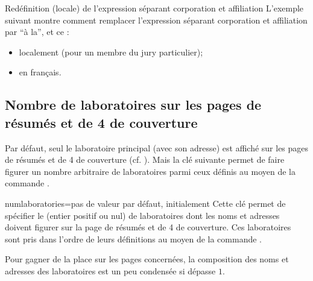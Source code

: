 \begin{dbexample}{Redéfinition (locale) de l'expression séparant corporation et
    affiliation}{}
  L'exemple suivant montre comment remplacer l'expression séparant corporation et
  affiliation par \enquote{\textvisiblespace{}à la\textvisiblespace{}}, et ce :
  \begin{itemize}
  \item localement (pour un membre du jury particulier);
  \item en français.
  \end{itemize}
\begin{bodycode}[listing options={showspaces}]
\end{bodycode}
\end{dbexample}

\subsection{Nombre de laboratoires sur les pages de résumés et de 4\ieme{} de couverture}
\label{sec-nombre-de-labor}
%
%

Par défaut, seul le laboratoire principal (avec son adresse) est affiché sur les
pages de résumés et de 4\ieme{} de couverture (cf. ). Mais la clé
 suivante permet de faire figurer un nombre arbitraire
de laboratoires parmi ceux définis au moyen de la commande .%
%
%

\begin{docKey}{numlaboratories}{=}{pas de valeur par
    défaut, initialement }
  Cette clé permet de spécifier le  (entier positif ou nul) de
  laboratoires dont les noms et adresses doivent figurer sur la page de résumés
  et de 4\ieme{} de couverture. Ces laboratoires sont pris dans l'ordre de
  leurs définitions au moyen de la commande .
\end{docKey}

Pour gagner de la place sur les pages concernées, la composition des noms et
adresses des laboratoires est un peu condensée si  dépasse $1$.

